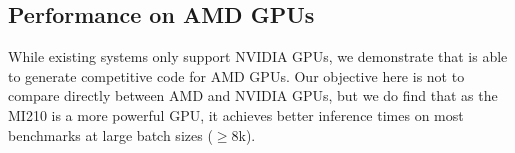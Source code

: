 

\subsection{Performance on AMD GPUs}

While existing systems only support NVIDIA GPUs, we demonstrate that \Treebeard{} 
is able to generate competitive code for AMD GPUs. Our objective here is not to compare directly 
between AMD and NVIDIA GPUs, but we do find that as the MI210 is a more powerful GPU, 
it achieves better inference times on most benchmarks at large batch sizes ($\geq8$k). 

